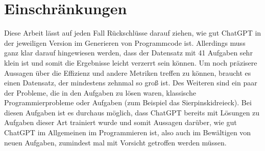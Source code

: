 \documentclass[class=scrbook, crop=false]{standalone}
\begin{document}
\chapter{Einschränkungen}
\label{ch:einschraenkungen}
    Diese Arbeit lässt auf jeden Fall Rückschlüsse darauf ziehen, wie gut ChatGPT in der jeweiligen Version im Generieren
    von Programmcode ist.
    Allerdings muss ganz klar darauf hingewiesen werden, dass der Datensatz mit 41 Aufgaben sehr klein ist und somit die Ergebnisse leicht verzerrt sein können.
    Um noch präzisere Aussagen über die Effizienz und andere Metriken treffen zu können, braucht es einen Datensatz, der mindestens
    zehnmal so groß ist.
    Des Weiteren sind ein paar der Probleme, die in den Aufgaben zu lösen waren, klassische Programmierprobleme oder Aufgaben (zum Beispiel das Sierpinskidreieck).
    Bei diesen Aufgaben ist es durchaus möglich, dass ChatGPT bereits mit Lösungen zu Aufgaben dieser Art trainiert wurde
    und somit Aussagen darüber, wie gut ChatGPT im Allgemeinen im Programmieren ist, also auch im Bewältigen von neuen Aufgaben,
    zumindest mal mit Vorsicht getroffen werden müssen.
\end{document}

